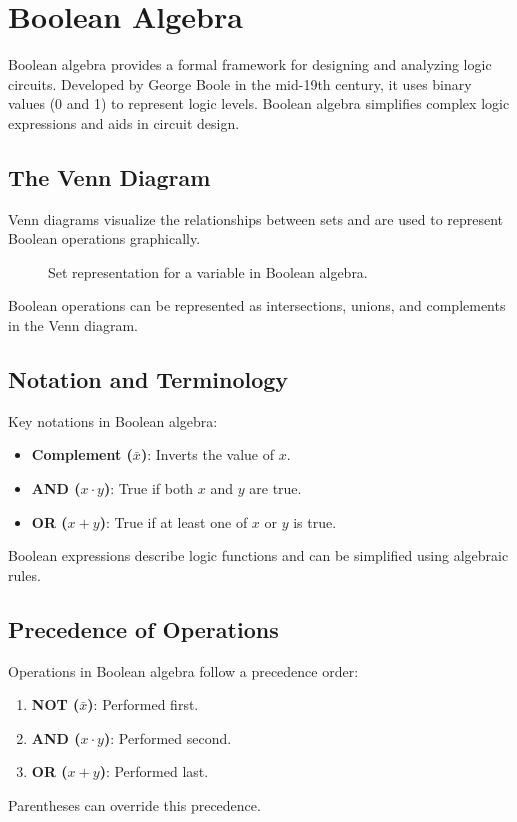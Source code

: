 \documentclass{article}
\begin{document}
\section{Boolean Algebra}
Boolean algebra provides a formal framework for designing and analyzing logic circuits. Developed by George Boole in the mid-19th century, it uses binary values (0 and 1) to represent logic levels. Boolean algebra simplifies complex logic expressions and aids in circuit design.

\subsection{The Venn Diagram}
Venn diagrams visualize the relationships between sets and are used to represent Boolean operations graphically.
\begin{figure}[h]
    \centering
    \caption{Set representation for a variable in Boolean algebra.}
\end{figure}

Boolean operations can be represented as intersections, unions, and complements in the Venn diagram.

\subsection{Notation and Terminology}
Key notations in Boolean algebra:
\begin{itemize}
    \item \textbf{Complement ($\bar{x}$)}: Inverts the value of $x$.
    \item \textbf{AND ($x \cdot y$)}: True if both $x$ and $y$ are true.
    \item \textbf{OR ($x + y$)}: True if at least one of $x$ or $y$ is true.
\end{itemize}
Boolean expressions describe logic functions and can be simplified using algebraic rules.

\subsection{Precedence of Operations}
Operations in Boolean algebra follow a precedence order:
\begin{enumerate}
    \item \textbf{NOT ($\bar{x}$)}: Performed first.
    \item \textbf{AND ($x \cdot y$)}: Performed second.
    \item \textbf{OR ($x + y$)}: Performed last.
\end{enumerate}
Parentheses can override this precedence.
\end{document}
